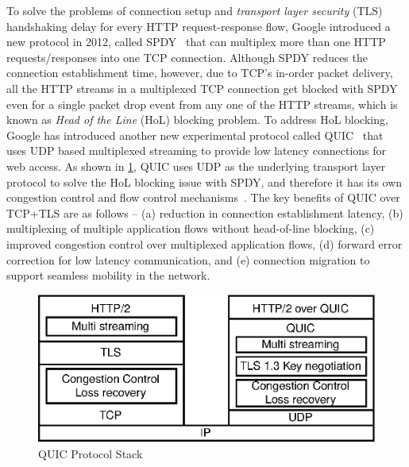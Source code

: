 To solve the problems of connection setup and {\em transport layer security} (TLS) handshaking delay for every HTTP request-response flow, Google introduced a new protocol in 2012, called  SPDY~\cite{SPDYingupweb,Erman} that can multiplex more than one HTTP requests/responses into one TCP connection. Although SPDY reduces the connection establishment time, however, due to TCP's in-order packet delivery, all the HTTP streams in a multiplexed TCP connection get blocked with SPDY even for a single packet drop event from any one of the HTTP streams, which is known as {\em Head of the Line} (HoL) blocking problem. To address HoL blocking, Google has introduced another new experimental protocol called QUIC~\cite{roskind2015quic,Cui2017,Megyesi2016} that uses UDP based multiplexed streaming to provide low latency connections for web access. As shown in \fig\ref{fig:quic-protocolstack}, QUIC uses UDP as the underlying transport layer protocol to solve the HoL blocking issue with SPDY, and therefore it has its own congestion control and flow control mechanisms~\cite{Cui2017,roskind2015quic}. The key benefits of QUIC over TCP+TLS are as follows -- (a) reduction in connection establishment latency, (b) multiplexing of multiple application flows without head-of-line blocking, (c) improved congestion control over multiplexed application flows, (d) forward error correction for low latency communication, and (e) connection migration to support seamless mobility in the network. 

\begin{figure}[!t]
	\centering
	\includegraphics[width=0.7\linewidth]{img/quic-protocolstack}
	\caption{QUIC Protocol Stack}
	\label{fig:quic-protocolstack}
\end{figure}



